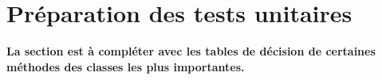 \documentclass[11pt,article]{article}
\begin{document}
\newpage

\section{Préparation des tests unitaires}

{\color{red}\textbf{La section est à compléter avec les tables de
    décision de certaines méthodes des classes les plus importantes.}}
\end{document}
